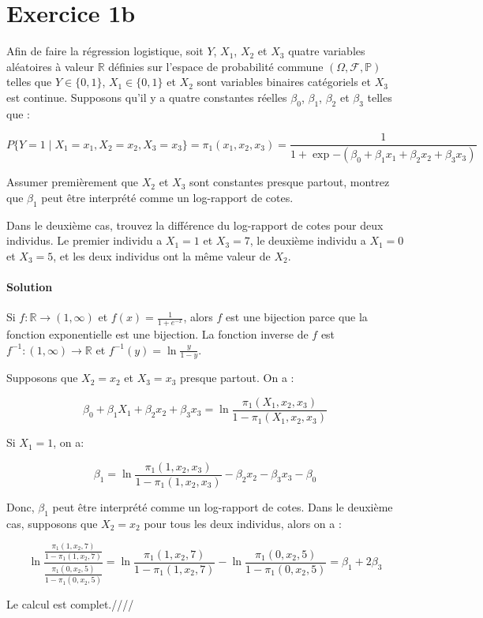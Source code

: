 \documentclass[../main.tex]{subfiles}
\begin{document}
\section{Exercice 1b}
\begin{CJK*}{UTF8}{gbsn}
Afin de faire la régression logistique, soit $Y$, $X_1$, $X_2$ et $X_3$ quatre 
variables aléatoires à valeur $\mathbb{R}$ définies sur 
l'espace de probabilité commune $(\Omega, \mathcal{F}, \mathbb{P})$ telles que 
$Y \in \{0,1\}$, $X_1 \in \{0,1\}$ et $X_2$ sont variables binaires catégoriels et $X_3$ est continue.
Supposons qu'il y a quatre constantes réelles $\beta_0$, $\beta_1$, $\beta_2$ et $\beta_3$ telles que :

\begin{equation*}
    P \{Y = 1 \mid X_1 = x_1, X_2 = x_2, X_3 = x_3 \} = \pi_1(x_1,x_2,x_3) = \frac{1}{1 + \exp{-(\beta_0 + \beta_1 x_1 + \beta_2 x_2 + \beta_3 x_3)}}
\end{equation*}

Assumer premièrement que $X_2$ et $X_3$ sont constantes presque partout, montrez que $\beta_1$ peut 
être interprété comme un log-rapport de cotes. 

Dans le deuxième cas, trouvez la différence du log-rapport de cotes pour deux individus.
Le premier individu a $X_1=1$ et $X_3 = 7$, le deuxième individu a $X_1=0$ et $X_3 = 5$, et les deux 
individus ont la même valeur de $X_2$.

\smallskip
\paragraph{Solution}
Si $f: \mathbb{R} \to (1, \infty)$ et $f(x) = \frac{1}{1+e^{-x}}$, alors $f$ est une bijection parce que la fonction exponentielle est une bijection.
La fonction inverse de $f$ est $f^{-1}: (1, \infty) \to \mathbb{R}$ et $f^{-1}(y) = \ln{\frac{y}{1-y}}$.

Supposons que $X_2 = x_2$ et $X_3 = x_3$ presque partout. On a :

\begin{equation*}
    \beta_0 + \beta_1 X_1 + \beta_2 x_2 + \beta_3 x_3 = \ln{\frac{ \pi_1(X_1,x_2,x_3)}{1-\pi_1(X_1,x_2,x_3)}}
\end{equation*}

Si $X_1 = 1$, on a:

\begin{equation*}
    \beta_1= \ln{\frac{ \pi_1(1,x_2,x_3)}{1-\pi_1(1,x_2,x_3)}} - \beta_2 x_2 - \beta_3 x_3 - \beta_0
\end{equation*}

Donc, $\beta_1$ peut être interprété comme un log-rapport de cotes.
Dans le deuxième cas, supposons que $X_2 = x_2$ pour tous les deux individus, alors on a :

\begin{equation*}
    \ln \frac{ \frac{\pi_1(1,x_2,7)}{1-\pi_1(1,x_2,7)}}{ \frac{\pi_1(0,x_2,5)}{1-\pi_1(0,x_2,5)}} =  
    \ln \frac{\pi_1(1,x_2,7)}{1-\pi_1(1,x_2,7)} - \ln \frac{\pi_1(0,x_2,5)}{1-\pi_1(0,x_2,5)} =  \beta_1 + 2\beta_3
\end{equation*}

Le calcul est complet.////
\end{CJK*}
\end{document}

